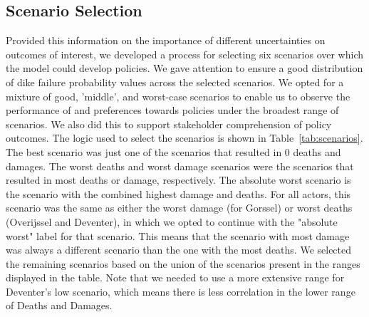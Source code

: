 \subsection{Scenario Selection}
Provided this information on the importance of different uncertainties on outcomes of interest, we developed a process for selecting six scenarios over which the model could develop policies. We gave attention to ensure a good distribution of dike failure probability values across the selected scenarios. We opted for a mixture of good, 'middle', and worst-case scenarios to enable us to observe the performance of and preferences towards policies under the broadest range of scenarios. We also did this to support stakeholder comprehension of policy outcomes. The logic used to select the scenarios is shown in Table~\ref{tab:scenarios}. The best scenario was just one of the scenarios that resulted in 0 deaths and damages. The worst deaths and worst damage scenarios were the scenarios that resulted in most deaths or damage, respectively. The absolute worst scenario is the scenario with the combined highest damage and deaths. For all actors, this scenario was the same as either the worst damage (for Gorssel) or worst deaths (Overijssel and Deventer), in which we opted to continue with the "absolute worst" label for that scenario. This means that the scenario with most damage was always a different scenario than the one with the most deaths. We selected the remaining scenarios based on the union of the scenarios present in the ranges displayed in the table. Note that we needed to use a more extensive range for Deventer's low scenario, which means there is less correlation in the lower range of Deaths and Damages.

